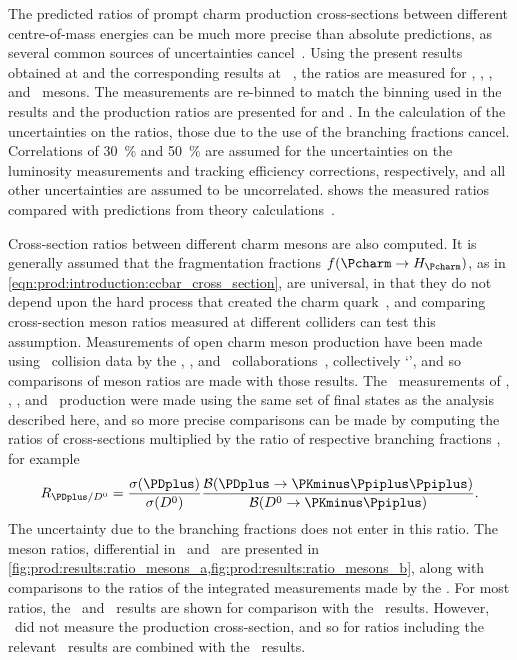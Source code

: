 The predicted ratios of prompt charm production cross-sections between 
different centre-of-mass energies can be much more precise than absolute 
predictions, as several common sources of uncertainties 
cancel~\cite{Gauld:2015yia,Cacciari:2015fta,Kniehl:2012ti}.
Using the present results obtained at  and the corresponding 
results at ~\cite{LHCb-PAPER-2012-041}, the ratios 
 are measured for \PDzero, \PDplus, \PDsplus, and \PDstarp\ 
mesons.
The  measurements are re-binned to match the binning used in the 
\sqrtseq{7} results and the production ratios are presented for \pTrange{0}{8} 
and \yrange{2}{4.5}.
In the calculation of the uncertainties on the ratios, those due to the use of 
the branching fractions cancel.
Correlations of \SI{30}{\percent} and \SI{50}{\percent} are assumed for the 
uncertainties on the luminosity measurements and tracking efficiency 
corrections, respectively, and all other uncertainties are assumed to be 
uncorrelated.
 shows the measured ratios compared with 
predictions from theory 
calculations~\cite{Gauld:2015yia,Cacciari:2015fta,Kniehl:2012ti}.

Cross-section ratios between different charm mesons are also computed.
It is generally assumed that the fragmentation fractions $f(\cToHc)$, as in 
\cref{eqn:prod:introduction:ccbar_cross_section}, are universal, in that they 
do not depend upon the hard process that created the charm 
quark~\cite{PDG2008,Lisovyi:2015uqa}, and comparing cross-section meson ratios 
measured at different colliders can test this assumption.
Measurements of open charm meson production have been made using \epem\ 
collision data by the \babar, \belle, and \cleo\ 
collaborations~\cite{Artuso:2004pj,Seuster:2005tr,Aubert:2002ue}, collectively 
`\bfactories', and so comparisons of meson ratios are made with those results.
The \bfactory\ measurements of \PDzero, \PDplus, \PDsplus, and \PDstarp\ 
production were made using the same set of final states as the analysis 
described here, and so more precise comparisons can be made by computing the 
ratios of cross-sections multiplied by the ratio of respective branching 
fractions \xsectimesbfrac, for example
\begin{equation*}
  \resultratio{\PDplus}{\PDzero} = \frac{%
    \xsec(\PDplus)
  }{%
    \xsec(\PDzero)
  }\frac{%
    \bfrac(\DpToKpipi)
  }{%
    \bfrac(\DzToKpi)
  }.
\end{equation*}
The uncertainty due to the branching fractions does not enter in this ratio.
The meson ratios, differential in \pT\ and \rapidity\, are presented in 
\cref{fig:prod:results:ratio_mesons_a,fig:prod:results:ratio_mesons_b}, along 
with comparisons to the ratios of the integrated measurements made by the 
\bfactories.
For most ratios, the \belle\ and \cleo\ results are shown for comparison with 
the \lhcb\ results.
However, \cleo\ did not measure the \PDsplus production cross-section, and so 
for ratios including \PDsplus the relevant \cleo\ results are combined with the 
\babar\ \PDsplus results.

